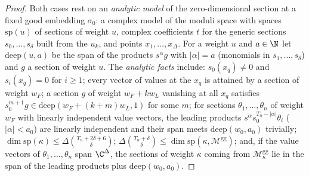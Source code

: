 \begin{proof}
Both cases rest on an \emph{analytic model} of the zero-dimensional section at a fixed good embedding $\sigma_0$: a complex
model of the moduli space with spaces $\mathrm{sp}(u)$ of sections of weight $u$, complex coefficients $t$ for the generic
sections $s_0,\dots,s_\delta$ built from the $u_k$, and points $x_1,\dots,x_\Delta$. For a weight $u$ and $a\in\N$ let
$\mathrm{deep}(u,a)$ be the span of the products $s^\alpha g$ with $|\alpha|=a$ (monomials in $s_1,\dots,s_\delta$) and $g$ a section of
weight $u$. The \emph{analytic facts} include: $s_0(x_q)\ne0$ and $s_i(x_q)=0$ for $i\ge1$; every vector of values at the
$x_q$ is attained by a section of weight $w_F$; a section $g$ of weight $w_F+kw_L$ vanishing at all $x_q$ satisfies
$s_0^{m+1}g\in\mathrm{deep}(w_F+(k+m)w_L,1)$ for some $m$; for sections $\theta_1,\dots,\theta_n$ of weight $w_F$ with linearly independent
value vectors, the leading products $s^\alpha s_0^{T_n-|\alpha|}\theta_i$ ($|\alpha|<a_0$) are linearly independent and their span meets
$\mathrm{deep}(w_0,a_0)$ trivially; $\dim\mathrm{sp}(\kappa)\le\Delta\binom{T_n+2\delta+6}\delta$; $\Delta\binom{T_n+\delta}\delta\le\dim
\mathrm{sp}(\kappa,\mathcal M^{\mathrm{gg}})$; and, if the value vectors of $\theta_1,\dots,\theta_n$ span $\C^\Delta$, the sections of weight
$\kappa$ coming from $\mathcal M^{\mathrm{gg}}_\kappa$ lie in the span of the leading products plus $\mathrm{deep}(w_0,a_0)$.


\end{proof}

